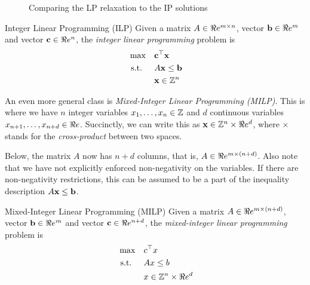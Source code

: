 
\begin{figure}
\caption{Comparing the LP relaxation to the IP solutions}
\end{figure}

\begin{general}{Integer Linear Programming (ILP)}{\npcomplete}
Given a matrix $A \in \Re e^{m\times n}$, vector $\mathbf{b} \in \Re e^m$ and vector $\mathbf{c} \in \Re e^n$, the \emph{integer linear programming} problem is
\begin{equation}
\label{eq:ILP}
\begin{split}
\max \quad & \mathbf{c}^\top \mathbf{x}\\
\mbox{ s.t. }  \quad & A\mathbf{x} \leq \mathbf{b}\\
& \mathbf{x} \in \mathbb{Z}^n
\end{split}
\end{equation}
\end{general}

An even more general class is \emph{Mixed-Integer Linear Programming (MILP)}.  This is where we have $n$ integer variables $x_1, \dots, x_n \in \mathbb{Z}$ and $d$ continuous variables $x_{n+1}, \dots, x_{n+d} \in \Re e$.  Succinctly, we can write this as $\mathbf{x} \in \mathbb{Z}^n \times \Re e^d$, where $\times$ stands for the \emph{cross-product} between two spaces.   

Below, the matrix $A$ now has $n+d$ columns, that is, $A \in \Re e^{m \times (n+d)}$.  Also note that we have not explicitly enforced non-negativity on the variables.  If there are non-negativity restrictions, this can be assumed to be a part of the inequality description $A\mathbf{x} \leq \mathbf{b}$.
\begin{general}{Mixed-Integer Linear Programming (MILP)}{\npcomplete}
Given a matrix $A \in \Re e^{m\times (n+d)}$, vector $\mathbf{b} \in \Re e^m$ and vector $\mathbf{c} \in \Re e^{n+d}$, the \emph{mixed-integer linear programming} problem is
\begin{equation}
\label{eq:MILP}
\begin{split}
\max \quad & c^\top x\\
\mbox{ s.t. }  \quad & Ax \leq b\\
& x \in \mathbb{Z}^n \times \Re e^d
\end{split}
\end{equation}
\end{general}

